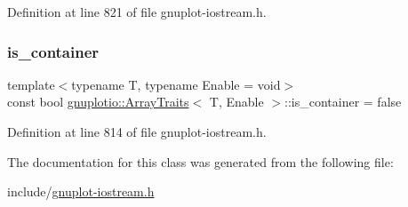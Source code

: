 Definition at line 821 of file gnuplot-\/iostream.\+h.

\mbox{\label{classgnuplotio_1_1_array_traits_ac5d19b25086565613c305960bd9d4a78}} 
\subsubsection{\texorpdfstring{is\+\_\+container}{is\_container}}
{\footnotesize\ttfamily template$<$typename T, typename Enable = void$>$ \\
const bool \hyperlink{classgnuplotio_1_1_array_traits}{gnuplotio\+::\+Array\+Traits}$<$ T, Enable $>$\+::is\+\_\+container = false\hspace{0.3cm}{\ttfamily [static]}}



Definition at line 814 of file gnuplot-\/iostream.\+h.



The documentation for this class was generated from the following file\+:\begin{DoxyCompactItemize}
\item 
include/\hyperlink{gnuplot-iostream_8h}{gnuplot-\/iostream.\+h}\end{DoxyCompactItemize}
